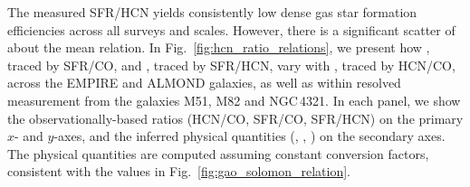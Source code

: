 \documentclass[letter, longauth]{aa} %
\begin{document}
The measured SFR/HCN yields consistently low dense gas star formation efficiencies across all surveys and scales.
However, there is a significant scatter of \sfedense about the mean relation.
In Fig.~\ref{fig:hcn_ratio_relations}, we present how \sfemol, traced by SFR/CO, and \sfedense, traced by SFR/HCN, vary with \fdense, traced by HCN/CO, across the EMPIRE and ALMOND galaxies, as well as within resolved measurement from the galaxies M51, M82 and NGC\,4321.
In each panel, we show the observationally-based ratios (HCN/CO, SFR/CO, SFR/HCN) on the primary $x$- and $y$-axes, and the inferred physical quantities (\fdense, \sfemol, \sfedense) on the secondary axes.
The physical quantities are computed assuming constant conversion factors, consistent with the values in Fig.~\ref{fig:gao_solomon_relation}.
\end{document}
